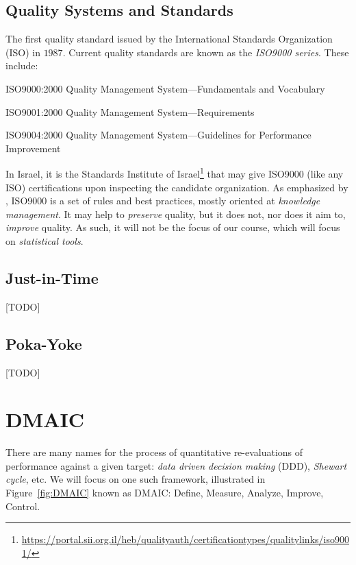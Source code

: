 \documentclass[12pt,a4paper]{report}
\begin{document}
\subsection{Quality Systems and Standards}
The first quality standard issued by the International Standards Organization (ISO) in $1987$.
Current quality standards are known as the \emph{ISO9000 series}. These include:
\begin{description}
\item ISO9000:2000 Quality Management System—Fundamentals and Vocabulary
\item ISO9001:2000 Quality Management System—Requirements
\item ISO9004:2000 Quality Management System—Guidelines for Performance Improvement
\end{description}
In Israel, it is the Standards Institute of Israel\footnote{\url{https://portal.sii.org.il/heb/qualityauth/certificationtypes/qualitylinks/iso9001/}} that may give ISO9000 (like any ISO) certifications upon inspecting the candidate organization.
As emphasized by \citet[p.24]{montgomery_introduction_2007}, ISO9000 is a set of rules and best practices, mostly oriented at \emph{knowledge management}. 
It may help to \emph{preserve} quality, but it does not, nor does it aim to, \emph{improve} quality.
As such, it will not be the focus of our course, which will focus on \emph{statistical tools}.



\subsection{Just-in-Time}
[TODO]


\subsection{Poka-Yoke}
[TODO]




\section{DMAIC}
There are many names for the process of quantitative re-evaluations of performance against a given target: \emph{data driven decision making} (DDD), \emph{Shewart cycle}, etc.
We will focus on one such framework, illustrated in Figure~\ref{fig:DMAIC} known as DMAIC: Define, Measure, Analyze, Improve, Control.
\end{document}
